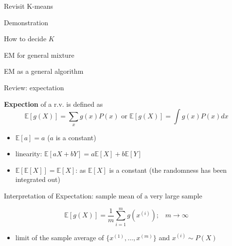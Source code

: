 \documentclass[11pt,ignorenonframetext,aspectratio=169]{beamer}
\providecommand{\tightlist}{%
  \setlength{\itemsep}{0pt}\setlength{\parskip}{0pt}}
\newcommand{\di}[2]{\ensuremath{ #1^{(#2)}}}
\newcommand{\E}[1]{\ensuremath{\mathbb{E}[#1]}}
\begin{document}
\begin{frame}{Revisit K-means}
\protect\hypertarget{revisit-k-means}{}

\end{frame}

\begin{frame}{Demonstration}
\protect\hypertarget{demonstration-1}{}

\end{frame}

\begin{frame}{How to decide \(K\)}
\protect\hypertarget{how-to-decide-k}{}

\end{frame}

\begin{frame}{EM for general mixture}
\protect\hypertarget{em-for-general-mixture}{}

\end{frame}

\begin{frame}{EM as a general algorithm}
\protect\hypertarget{em-as-a-general-algorithm}{}

\end{frame}

\begin{frame}{Review: expectation}
\protect\hypertarget{review-expectation}{}

\textbf{Expection} of a r.v. is defined as
\[\E{g(X)} = \sum_x g(x) P(x) \text{ or } \E{g(X)} = \int g(x) P(x)dx\]

\begin{itemize}
\tightlist
\item
  \(\E{a} = a\) (\(a\) is a constant)
\item
  linearity: \(\E{aX +bY} = a\E{X} + b\E{Y}\)
\item
  \(\E{\E{X}} = \E{X}\): as \(\E{X}\) is a constant (the randomness has
  been integrated out)
\end{itemize}

\bigskip

Interpretation of Expectation: sample mean of a very large sample

\[\E{g(X)} = \frac{1}{m} \sum_{i=1}^m g(\di{x}{i});\;\;\; m\rightarrow \infty\]

\begin{itemize}
\tightlist
\item
  limit of the sample average of \(\{\di{x}{1}, \ldots, \di{x}{m}\}\)
  and \(\di{x}{i} \sim P(X)\)
\end{itemize}

\end{frame}
\end{document}
